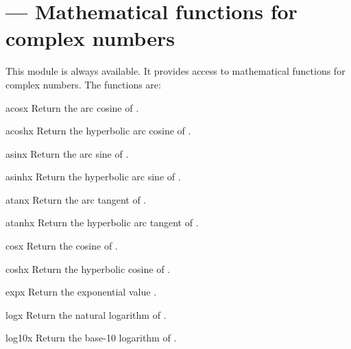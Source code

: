 \section{ ---
         Mathematical functions for complex numbers}


This module is always available.  It provides access to mathematical
functions for complex numbers.  The functions are:

\begin{funcdesc}{acos}{x}
Return the arc cosine of .
\end{funcdesc}

\begin{funcdesc}{acosh}{x}
Return the hyperbolic arc cosine of .
\end{funcdesc}

\begin{funcdesc}{asin}{x}
Return the arc sine of .
\end{funcdesc}

\begin{funcdesc}{asinh}{x}
Return the hyperbolic arc sine of .
\end{funcdesc}

\begin{funcdesc}{atan}{x}
Return the arc tangent of .
\end{funcdesc}

\begin{funcdesc}{atanh}{x}
Return the hyperbolic arc tangent of .
\end{funcdesc}

\begin{funcdesc}{cos}{x}
Return the cosine of .
\end{funcdesc}

\begin{funcdesc}{cosh}{x}
Return the hyperbolic cosine of .
\end{funcdesc}

\begin{funcdesc}{exp}{x}
Return the exponential value .
\end{funcdesc}

\begin{funcdesc}{log}{x}
Return the natural logarithm of .
\end{funcdesc}

\begin{funcdesc}{log10}{x}
Return the base-10 logarithm of .
\end{funcdesc}

